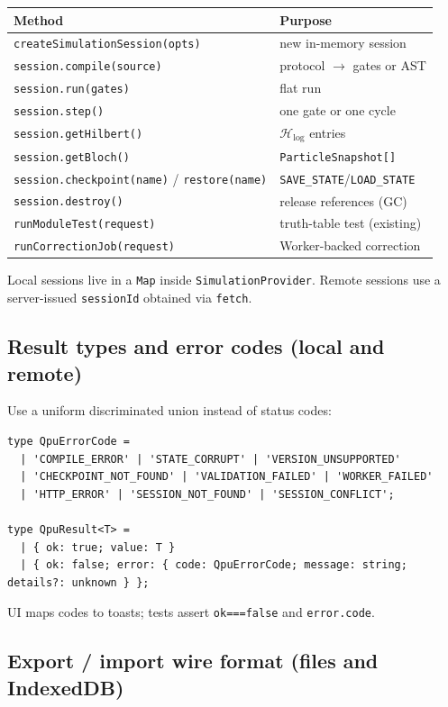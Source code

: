 \documentclass[11pt,a4paper]{article}
\newcommand{\HS}{\mathcal{H}_{\mathrm{log}}}
\begin{document}
\begin{center}
\begin{tabular}{@{}ll@{}}
\toprule
Method & Purpose \\
\midrule
\texttt{createSimulationSession(opts)} & new in-memory session \\
\texttt{session.compile(source)} & protocol $\rightarrow$ gates or AST \\
\texttt{session.run(gates)} & flat run \\
\texttt{session.step()} & one gate or one cycle \\
\texttt{session.getHilbert()} & $\HS$ entries \\
\texttt{session.getBloch()} & \texttt{ParticleSnapshot[]} \\
\texttt{session.checkpoint(name)} / \texttt{restore(name)} & \texttt{SAVE\_STATE}/\texttt{LOAD\_STATE} \\
\texttt{session.destroy()} & release references (GC) \\
\texttt{runModuleTest(request)} & truth-table test (existing) \\
\texttt{runCorrectionJob(request)} & Worker-backed correction \\
\bottomrule
\end{tabular}
\end{center}

Local sessions live in a \texttt{Map} inside \texttt{SimulationProvider}. Remote sessions use a server-issued \texttt{sessionId} obtained via \texttt{fetch}.

\subsection{Result types and error codes (local and remote)}

Use a uniform discriminated union instead of status codes:
\begin{lstlisting}[style=protocol]
type QpuErrorCode =
  | 'COMPILE_ERROR' | 'STATE_CORRUPT' | 'VERSION_UNSUPPORTED'
  | 'CHECKPOINT_NOT_FOUND' | 'VALIDATION_FAILED' | 'WORKER_FAILED'
  | 'HTTP_ERROR' | 'SESSION_NOT_FOUND' | 'SESSION_CONFLICT';

type QpuResult<T> =
  | { ok: true; value: T }
  | { ok: false; error: { code: QpuErrorCode; message: string; details?: unknown } };
\end{lstlisting}
UI maps codes to toasts; tests assert \texttt{ok===false} and \texttt{error.code}.

\subsection{Export / import wire format (files and IndexedDB)}
\end{document}
